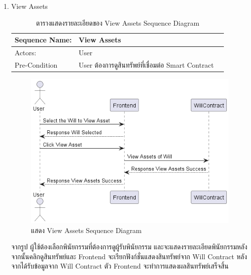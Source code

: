 \documentclass[12pt,oneside,openright,a4paper]{cpe-thai-project}
\begin{document}
\begin{enumerate}[label=\thesubsection.\arabic*,leftmargin=0pt,itemindent=1.25cm]
	\clearpage
	\item View Assets
	\begin{table}[h]
	\centering
	\caption{ตารางแสดงรายละเอียดของ View Assets Sequence Diagram}
	\begin{tabularx}{\textwidth}{|l|X|X|} 
		\hline
		Sequence Name: & View Assets                                \\ 
		\hline
		Actors:        & User                                                  \\ 
		\hline
		Pre-Condition  & User ต้องการดูสินทรัพย์ที่เชื่อมต่อ Smart
		  Contract  \\
		\hline
		\end{tabularx}
	\end{table}
		\begin{figure}[!thb]
			\centering
			\includegraphics[scale=0.6]{viewAssetseq}
			\caption{แสดง View Assets Sequence Diagram}
		\end{figure}
		\FloatBarrier
	\tab จากรูป ผู้ใช้ต้องเลือกพินัยกรรมที่ต้องการดูผู้รับพินัยกรรม และจะแสดงรายละเอียดพินัยกรรมหลังจากนั้นคลิกดูสินทรัพย์และ Frontend จะเรียกฟังก์ชั่นแสดงสินทรัพย์จาก Will Contract หลังจากได้รับข้อมูลจาก Will Contract ตัว Frontend จะทำการแสดงผลสินทรัพย์เสร็จสิ้น
	

\end{enumerate}
\end{document}
